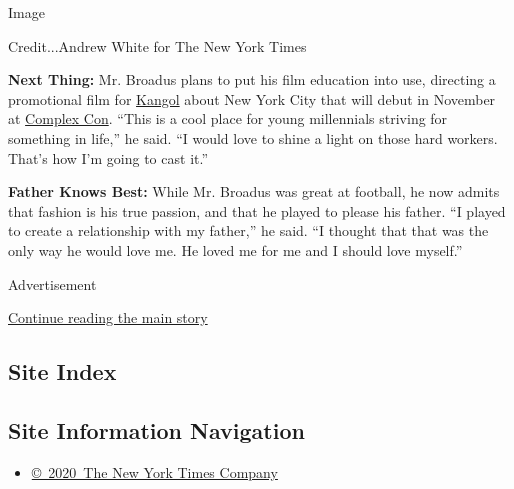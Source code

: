 Image

Credit...Andrew White for The New York Times

\textbf{Next Thing:} Mr. Broadus plans to put his film education into
use, directing a promotional film for
\href{http://www.kangol.com/us/}{Kangol} about New York City that will
debut in November at \href{https://www.complexcon.com/}{Complex Con}.
``This is a cool place for young millennials striving for something in
life,'' he said. ``I would love to shine a light on those hard workers.
That's how I'm going to cast it.''

\textbf{Father Knows Best:} While Mr. Broadus was great at football, he
now admits that fashion is his true passion, and that he played to
please his father. ``I played to create a relationship with my father,''
he said. ``I thought that that was the only way he would love me. He
loved me for me and I should love myself.''

Advertisement

\protect\hyperlink{after-bottom}{Continue reading the main story}

\hypertarget{site-index}{%
\subsection{Site Index}\label{site-index}}

\hypertarget{site-information-navigation}{%
\subsection{Site Information
Navigation}\label{site-information-navigation}}

\begin{itemize}
\tightlist
\item
  \href{https://help.nytimes3xbfgragh.onion/hc/en-us/articles/115014792127-Copyright-notice}{©~2020~The
  New York Times Company}
\end{itemize}

